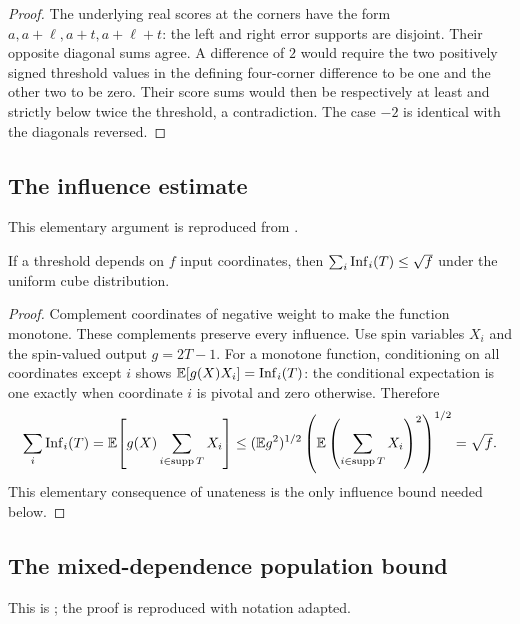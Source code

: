 \begin{proof}
The underlying real scores at the corners have the form
$a,a+\ell,a+t,a+\ell+t$: the left and right error supports are
disjoint. Their opposite diagonal sums agree. A difference of $2$
would require the two positively signed threshold values in
the defining four-corner difference to be one and the other two to be zero. Their score
sums would then be respectively at least and strictly below twice the
threshold, a contradiction. The case $-2$ is identical with the
diagonals reversed. \end{proof}

\subsection{The influence estimate}
This elementary argument is reproduced from \cite[Lemma~A.3]{Nag72}.

\begin{lemma}
\label{earlier:star-influence}
If a threshold depends on $f$ input coordinates, then
$\sum_i\operatorname{Inf}_i(T)\le\sqrt f$ under the uniform cube distribution.
\end{lemma}
\begin{proof}
Complement coordinates of negative weight to make the function monotone.
These complements preserve every influence. Use spin variables $X_i$
and the spin-valued output $g=2T-1$. For a monotone function,
conditioning on all coordinates except $i$ shows
$\mathbb E[g(X)X_i]=\operatorname{Inf}_i(T)$: the conditional expectation is one exactly
when coordinate $i$ is pivotal and zero otherwise. Therefore
\[
\sum_i\operatorname{Inf}_i(T)=\mathbb E\!\left[g(X)\sum_{i\in\operatorname{supp} T}X_i\right]
\le (\mathbb E g^2)^{1/2}
     \left(\mathbb E\left(\sum_{i\in\operatorname{supp} T}X_i\right)^2\right)^{1/2}
=\sqrt f.
\]
This elementary consequence of unateness is the only influence bound
needed below.
\end{proof}

\subsection{The mixed-dependence population bound}
\label{earlier:imp:population}
This is \cite[Theorem~A.4]{Nag72}; the proof is reproduced with notation adapted.

